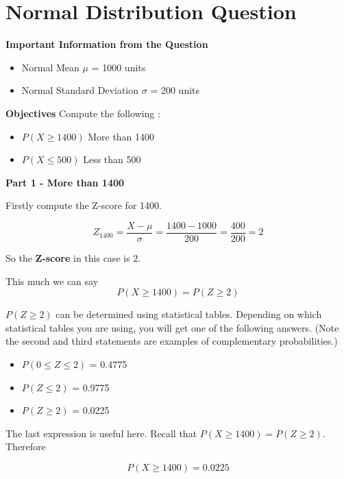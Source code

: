 \documentclass[]{report}
\begin{document}
\section*{Normal Distribution Question}

\noindent \textbf{Important Information from the Question}
\begin{itemize}
	\item Normal Mean $\mu$ = 1000 units
	\item Normal Standard Deviation $\sigma$ = 200 units 
\end{itemize}
\smallskip
\noindent \textbf{Objectives}
Compute the following : 
\begin{itemize}
	\item $P(X \geq 1400 )$ More than 1400
	\item $P(X \leq 500)$ Less than 500
\end{itemize}
\smallskip

\noindent \textbf{Part 1 -  More than 1400}

Firstly compute the Z-score for 1400.

\[ Z_{1400} =  \frac{X - \mu}{\sigma} = \frac{1400 - 1000}{200} = \frac{400}{200} = 2  \]

So the \textbf{Z-score} in this case is 2.

This much we can say
\[P(X \geq 1400) = P(Z \geq 2)\]

$P(Z \geq 2)$ can be determined using statistical tables.
Depending on which statistical tables you are using, you will get one of the following answers. (Note the 
second and third statements are examples of complementary probabilities.)
\begin{itemize}
	\item $P (0 \leq Z \leq 2)$ = 0.4775
	\item $P ( Z \leq 2)$ = 0.9775
	\item $P ( Z \geq 2)$ = 0.0225
\end{itemize}
The last expression is useful here. Recall that $P(X \geq 1400) = P(Z \geq 2)$. Therefore

\[P(X \geq 1400) = 0.0225\]
\end{document}
